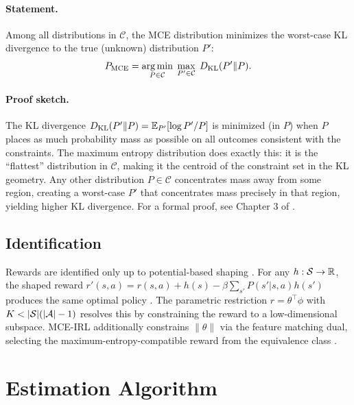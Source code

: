 \documentclass[10pt]{article}
\newcommand{\calC}{\mathcal{C}}
\begin{document}
\paragraph{Statement.}
Among all distributions in $\calC$, the MCE distribution minimizes the worst-case KL divergence to the true (unknown) distribution $P'$:
\begin{equation}
P_{\text{MCE}} = \argmin_{P \in \calC} \; \max_{P' \in \calC} \; D_{\text{KL}}(P' \| P).
\end{equation}

\paragraph{Proof sketch.}
The KL divergence $D_{\text{KL}}(P' \| P) = \mathbb{E}_{P'}[\log P'/P]$ is minimized (in $P$) when $P$ places as much probability mass as possible on all outcomes consistent with the constraints. The maximum entropy distribution does exactly this: it is the ``flattest'' distribution in $\calC$, making it the centroid of the constraint set in the KL geometry. Any other distribution $P \in \calC$ concentrates mass away from some region, creating a worst-case $P'$ that concentrates mass precisely in that region, yielding higher KL divergence. For a formal proof, see Chapter 3 of \citet{ziebart2010}.

\subsection{Identification}

Rewards are identified only up to potential-based shaping \citep{ng1999}. For any $h: \mathcal{S} \to \mathbb{R}$, the shaped reward $r'(s,a) = r(s,a) + h(s) - \beta \sum_{s'} P(s'|s,a) h(s')$ produces the same optimal policy \citep{magnacThesmar2002}. The parametric restriction $r = \theta^\top \phi$ with $K < |\mathcal{S}|(|\mathcal{A}|-1)$ resolves this by constraining the reward to a low-dimensional subspace. MCE-IRL additionally constrains $\|\theta\|$ via the feature matching dual, selecting the maximum-entropy-compatible reward from the equivalence class \citep{kim2021}.


\section{Estimation Algorithm}
\end{document}
